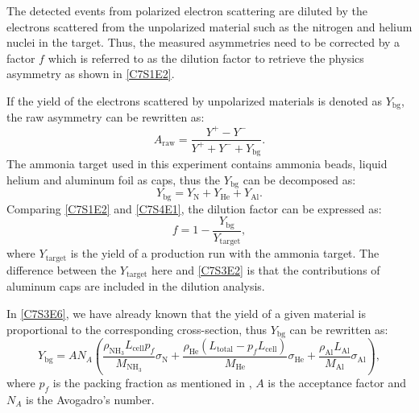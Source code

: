 The detected events from polarized electron scattering are diluted by the electrons scattered from the unpolarized material such as the nitrogen and helium nuclei in the target. Thus, the measured asymmetries need to be corrected by a factor $f$ which is referred to as the dilution factor to retrieve the physics asymmetry as shown in \cref{C7S1E2}.

If the yield of the electrons scattered by unpolarized materials is denoted as $Y_{\mathrm{bg}}$, the raw asymmetry can be rewritten as:
\begin{equation} \label{C7S4E1}
A_{\mathrm{raw}} = \frac{Y^+-Y^-}{Y^++Y^-+Y_{\mathrm{bg}}}.
\end{equation}
The ammonia target used in this experiment contains ammonia beads, liquid helium and aluminum foil as caps, thus the $Y_{\mathrm{bg}}$ can be decomposed as:
\begin{equation} \label{C7S4E2}
Y_{\mathrm{bg}} = Y_{\mathrm{N}}+Y_{\mathrm{He}}+Y_{\mathrm{Al}}.
\end{equation}
Comparing \cref{C7S1E2} and \cref{C7S4E1}, the dilution factor can be expressed as:
\begin{equation} \label{C7S4E3}
f = 1-\frac{Y_{\mathrm{bg}}}{Y_{\mathrm{target}}},
\end{equation}
where $Y_{\mathrm{target}}$ is the yield of a production run with the ammonia target. The difference between the $Y_{\mathrm{target}}$ here and \cref{C7S3E2} is that the contributions of aluminum caps are included in the dilution analysis.

In \cref{C7S3E6}, we have already known that the yield of a given material is proportional to the corresponding cross-section, thus $Y_{\mathrm{bg}}$ can be rewritten as:
\begin{equation} \label{C7S4E4}
Y_{\mathrm{bg}} = AN_A\left(\frac{\rho_{\mathrm{NH_3}}L_{\mathrm{cell}}p_f}{M_{\mathrm{NH_3}}}\sigma_{\mathrm{N}}+\frac{\rho_{\mathrm{He}}(L_{\mathrm{total}}-p_fL_{\mathrm{cell}})}{M_{\mathrm{He}}}\sigma_{\mathrm{He}}+\frac{\rho_{\mathrm{Al}}L_{\mathrm{Al}}}{M_{\mathrm{Al}}}\sigma_{\mathrm{Al}}\right),
\end{equation}
where $p_f$ is the packing fraction as mentioned in , $A$ is the acceptance factor and $N_A$ is the Avogadro's number.

